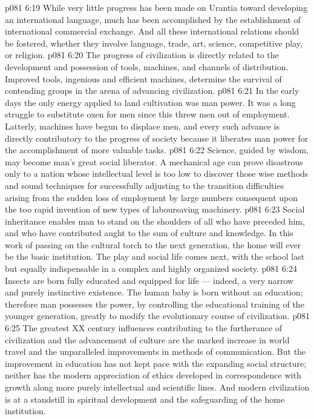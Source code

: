 \vs p081 6:19 While very little progress has been made on Urantia toward developing an international language, much has been accomplished by the establishment of international commercial exchange. And all these international relations should be fostered, whether they involve language, trade, art, science, competitive play, or religion.
\vs p081 6:20 \bibnobreakspace {} The progress of civilization is directly related to the development and possession of tools, machines, and channels of distribution. Improved tools, ingenious and efficient machines, determine the survival of contending groups in the arena of advancing civilization.
\vs p081 6:21 In the early days the only energy applied to land cultivation was man power. It was a long struggle to substitute oxen for men since this threw men out of employment. Latterly, machines have begun to displace men, and every such advance is directly contributory to the progress of society because it liberates man power for the accomplishment of more valuable tasks.
\vs p081 6:22 Science, guided by wisdom, may become man’s great social liberator. A mechanical age can prove disastrous only to a nation whose intellectual level is too low to discover those wise methods and sound techniques for successfully adjusting to the transition difficulties arising from the sudden loss of employment by large numbers consequent upon the too rapid invention of new types of laboursaving machinery.
\vs p081 6:23 \bibnobreakspace {} Social inheritance enables man to stand on the shoulders of all who have preceded him, and who have contributed aught to the sum of culture and knowledge. In this work of passing on the cultural torch to the next generation, the home will ever be the basic institution. The play and social life comes next, with the school last but equally indispensable in a complex and highly organized society.
\vs p081 6:24 Insects are born fully educated and equipped for life --- indeed, a very narrow and purely instinctive existence. The human baby is born without an education; therefore man possesses the power, by controlling the educational training of the younger generation, greatly to modify the evolutionary course of civilization.
\vs p081 6:25 The greatest XX century influences contributing to the furtherance of civilization and the advancement of culture are the marked increase in world travel and the unparalleled improvements in methods of communication. But the improvement in education has not kept pace with the expanding social structure; neither has the modern appreciation of ethics developed in correspondence with growth along more purely intellectual and scientific lines. And modern civilization is at a standstill in spiritual development and the safeguarding of the home institution.
